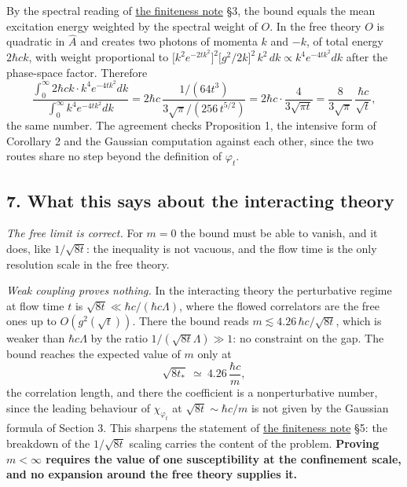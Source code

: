 \documentclass[11pt,a4paper]{article}
\begin{document}
By the spectral reading of
\href{finiteness-half-flowed-susceptibility.md}{the finiteness note} §3,
the bound equals the mean excitation energy weighted by the spectral
weight of \(O\). In the free theory \(O\) is quadratic in \(\hat A\) and
creates two photons of momenta \(k\) and \(-k\), of total energy
\(2\hbar ck\), with weight proportional to
\(\big[k^2e^{-2tk^2}\big]^2\big[g^2/2k\big]^2\,k^2\,dk\propto k^4e^{-4tk^2}dk\)
after the phase-space factor. Therefore
\[\frac{\int_0^\infty 2\hbar ck\cdot k^4e^{-4tk^2}dk}{\int_0^\infty k^4e^{-4tk^2}dk}
=2\hbar c\,\frac{1/(64t^3)}{3\sqrt\pi/(256\,t^{5/2})}
=2\hbar c\cdot\frac{4}{3\sqrt{\pi t}}
=\frac{8}{3\sqrt\pi}\,\frac{\hbar c}{\sqrt t},\] the same number. The
agreement checks Proposition 1, the intensive form of Corollary 2 and
the Gaussian computation against each other, since the two routes share
no step beyond the definition of \(\varphi_t\).

\hypertarget{what-this-says-about-the-interacting-theory}{%
\subsection{7. What this says about the interacting
theory}\label{what-this-says-about-the-interacting-theory}}

\emph{The free limit is correct.} For \(m=0\) the bound must be able to
vanish, and it does, like \(1/\sqrt{8t}\): the inequality is not
vacuous, and the flow time is the only resolution scale in the free
theory.

\emph{Weak coupling proves nothing.} In the interacting theory the
perturbative regime at flow time \(t\) is
\(\sqrt{8t}\ll\hbar c/(\hbar c\Lambda)\), where the flowed correlators
are the free ones up to \(O(g^2(\sqrt t))\). There the bound reads
\(m\lesssim4.26\,\hbar c/\sqrt{8t}\), which is weaker than
\(\hbar c\Lambda\) by the ratio \(1/(\sqrt{8t}\Lambda)\gg1\): no
constraint on the gap. The bound reaches the expected value of \(m\)
only at \[\sqrt{8t_*}\ \simeq\ 4.26\,\frac{\hbar c}{m},\] the
correlation length, and there the coefficient is a nonperturbative
number, since the leading behaviour of \(\chi_{\varphi_t}\) at
\(\sqrt{8t}\sim\hbar c/m\) is not given by the Gaussian formula of
Section 3. This sharpens the statement of
\href{finiteness-half-flowed-susceptibility.md}{the finiteness note} §5:
the breakdown of the \(1/\sqrt{8t}\) scaling carries the content of the
problem. \textbf{Proving \(m<\infty\) requires the value of one
susceptibility at the confinement scale, and no expansion around the
free theory supplies it.}
\end{document}
